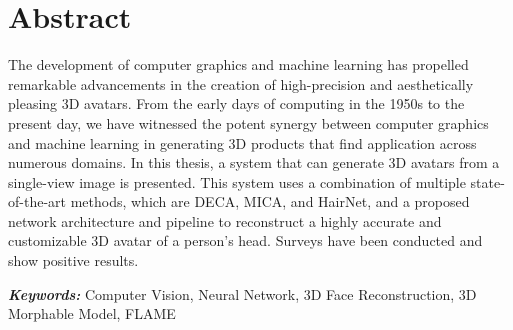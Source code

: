 




\section*{Abstract}

The development of computer graphics and machine learning has propelled remarkable advancements in the creation of high-precision and aesthetically pleasing 3D avatars. From the early days of computing in the 1950s to the present day, we have witnessed the potent synergy between computer graphics and machine learning in generating 3D products that find application across numerous domains. In this thesis, a system that can generate 3D avatars from a single-view image is presented. This system uses a combination of multiple state-of-the-art methods, which are DECA, MICA, and HairNet, and a proposed network architecture and pipeline to reconstruct a highly accurate and customizable 3D avatar of a person's head. Surveys have been conducted and show positive results.

\textbf{\textit{Keywords:}} Computer Vision, Neural Network, 3D Face Reconstruction, 3D Morphable Model, FLAME